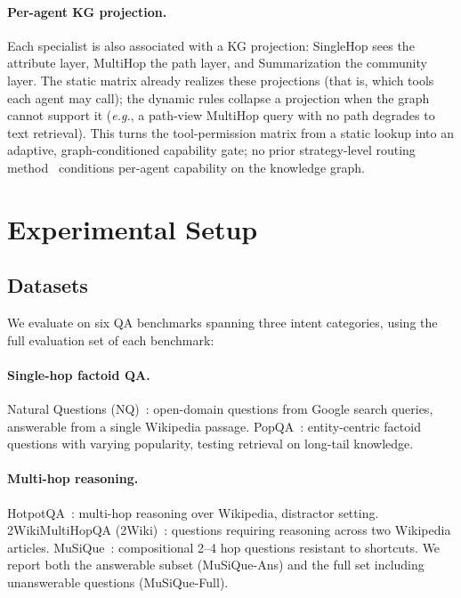 \documentclass[11pt,a4paper]{article}
\newcommand{\eg}{\textit{e.g.}}
\begin{document}
\paragraph{Per-agent KG projection.}
Each specialist is also associated with a KG projection: SingleHop sees the attribute layer, MultiHop the path layer, and Summarization the community layer.
The static matrix already realizes these projections (that is, which tools each agent may call); the dynamic rules collapse a projection when the graph cannot support it (\eg, a path-view MultiHop query with no path degrades to text retrieval).
This turns the tool-permission matrix from a static lookup into an adaptive, graph-conditioned capability gate; no prior strategy-level routing method~\citep{jeong2024adaptive} conditions per-agent capability on the knowledge graph.

\section{Experimental Setup}
\label{sec:setup}

\subsection{Datasets}

We evaluate on six QA benchmarks spanning three intent categories, using the full evaluation set of each benchmark:

\paragraph{Single-hop factoid QA.}
Natural Questions (NQ)~\citep{kwiatkowski2019nq}: open-domain questions from Google search queries, answerable from a single Wikipedia passage.
PopQA~\citep{mallen2023popqa}: entity-centric factoid questions with varying popularity, testing retrieval on long-tail knowledge.

\paragraph{Multi-hop reasoning.}
HotpotQA~\citep{yang2018hotpotqa}: multi-hop reasoning over Wikipedia, distractor setting.
2WikiMultiHopQA (2Wiki)~\citep{ho2020constructing}: questions requiring reasoning across two Wikipedia articles.
MuSiQue~\citep{trivedi2022musique}: compositional 2--4 hop questions resistant to shortcuts. We report both the answerable subset (MuSiQue-Ans) and the full set including unanswerable questions (MuSiQue-Full).
\end{document}
